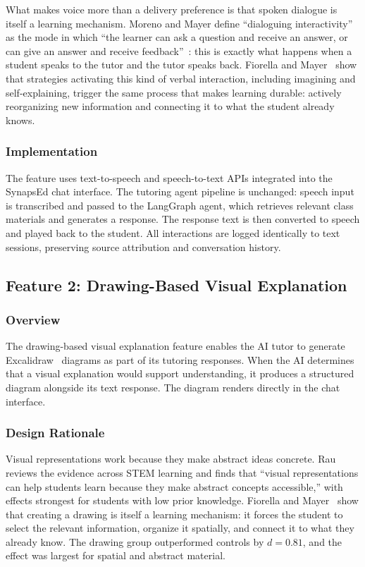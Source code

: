 \documentclass{stylefiles/capstone}
\begin{document}
What makes voice more than a delivery preference is that spoken dialogue is itself a learning mechanism. Moreno and Mayer define ``dialoguing interactivity'' as the mode in which ``the learner can ask a question and receive an answer, or can give an answer and receive feedback''~\cite{moreno2007interactive}: this is exactly what happens when a student speaks to the tutor and the tutor speaks back. Fiorella and Mayer~\cite{fiorella2016generative} show that strategies activating this kind of verbal interaction, including imagining and self-explaining, trigger the same process that makes learning durable: actively reorganizing new information and connecting it to what the student already knows.

\subsubsection{Implementation}

The feature uses text-to-speech and speech-to-text APIs integrated into the SynapsEd chat interface. The tutoring agent pipeline is unchanged: speech input is transcribed and passed to the LangGraph agent, which retrieves relevant class materials and generates a response. The response text is then converted to speech and played back to the student. All interactions are logged identically to text sessions, preserving source attribution and conversation history.

\subsection{Feature 2: Drawing-Based Visual Explanation}

\subsubsection{Overview}

The drawing-based visual explanation feature enables the AI tutor to generate Excalidraw~\cite{excalidraw2024} diagrams as part of its tutoring responses. When the AI determines that a visual explanation would support understanding, it produces a structured diagram alongside its text response. The diagram renders directly in the chat interface.

\subsubsection{Design Rationale}

Visual representations work because they make abstract ideas concrete. Rau~\cite{rau2017visual} reviews the evidence across STEM learning and finds that ``visual representations can help students learn because they make abstract concepts accessible,'' with effects strongest for students with low prior knowledge. Fiorella and Mayer~\cite{fiorella2016generative} show that creating a drawing is itself a learning mechanism: it forces the student to select the relevant information, organize it spatially, and connect it to what they already know. The drawing group outperformed controls by $d = 0.81$, and the effect was largest for spatial and abstract material.
\end{document}
